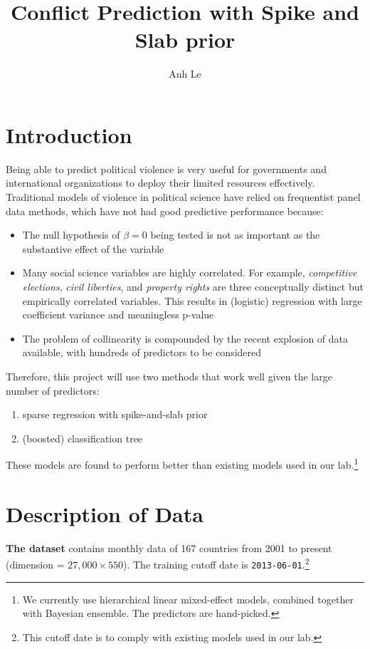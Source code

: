 \documentclass[12pt]{article}
\title{Conflict Prediction with Spike and Slab prior}
\author{Anh Le}
\begin{document}
\maketitle

\section*{Introduction}

Being able to predict political violence is very useful for governments and international organizations to deploy their limited resources effectively. Traditional models of violence in political science have relied on frequentist panel data methods, which have not had good predictive performance because:
\begin{itemize}
\item The null hypothesis of $\beta = 0$ being tested is not as important as the substantive effect of the variable
\item Many social science variables are highly correlated. For example, \textit{competitive elections}, \textit{civil liberties}, and \textit{property rights} are three conceptually distinct but empirically correlated variables. This results in (logistic) regression with large coefficient variance and meaningless p-value
\item The problem of collinearity is compounded by the recent explosion of data available, with hundreds of predictors to be considered
\end{itemize}

Therefore, this project will use two methods that work well given the large number of predictors:
\begin{enumerate}
\item sparse regression with spike-and-slab prior
\item (boosted) classification tree
\end{enumerate}

These models are found to perform better than existing models used in our lab.\footnote{We currently use hierarchical linear mixed-effect models, combined together with Bayesian ensemble. The predictors are hand-picked.}

\section{Description of Data}

\textbf{The dataset} contains monthly data of 167 countries from 2001 to present (dimension = $27,000 \times 550$). The training cutoff date is \verb|2013-06-01|.\footnote{This cutoff date is to comply with existing models used in our lab.}
\end{document}

